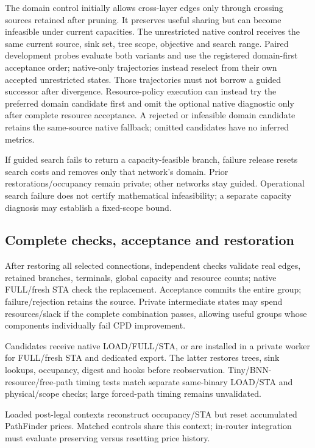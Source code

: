 \documentclass[conference,10pt]{IEEEtran}
\begin{document}
The domain control initially allows cross-layer edges only through crossing sources retained after pruning. It preserves useful sharing but can become infeasible under current capacities. The unrestricted native control receives the same current source, sink set, tree scope, objective and search range. Paired development probes evaluate both variants and use the registered domain-first acceptance order; native-only trajectories instead reselect from their own accepted unrestricted states. Those trajectories must not borrow a guided successor after divergence. Resource-policy execution can instead try the preferred domain candidate first and omit the optional native diagnostic only after complete resource acceptance. A rejected or infeasible domain candidate retains the same-source native fallback; omitted candidates have no inferred metrics.

If guided search fails to return a capacity-feasible branch, failure release resets search costs and removes only that network's domain. Prior restorations/occupancy remain private; other networks stay guided. Operational search failure does not certify mathematical infeasibility; a separate capacity diagnosis may establish a fixed-scope bound.

\subsection{Complete checks, acceptance and restoration}
After restoring all selected connections, independent checks validate real edges, retained branches, terminals, global capacity and resource counts; native FULL/fresh STA check the replacement. Acceptance commits the entire group; failure/rejection retains the source. Private intermediate states may spend resources/slack if the complete combination passes, allowing useful groups whose components individually fail CPD improvement.

Candidates receive native LOAD/FULL/STA, or are installed in a private worker for FULL/fresh STA and dedicated export. The latter restores trees, sink lookups, occupancy, digest and hooks before reobservation. Tiny/BNN-resource/free-path timing tests match separate same-binary LOAD/STA and physical/scope checks; large forced-path timing remains unvalidated.

Loaded post-legal contexts reconstruct occupancy/STA but reset accumulated PathFinder prices. Matched controls share this context; in-router integration must evaluate preserving versus resetting price history.
\end{document}
